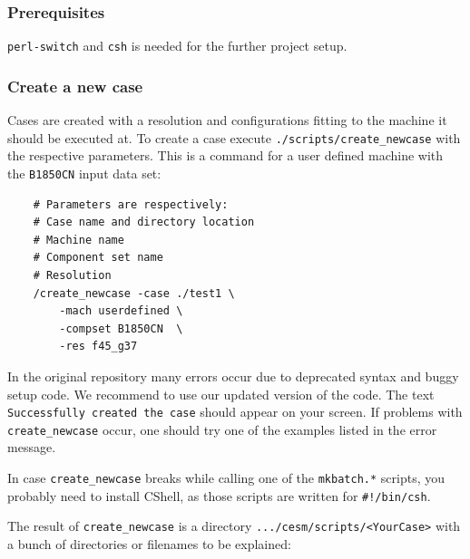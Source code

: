 \documentclass[]{article}
\begin{document}
\subsubsection{Prerequisites}\label{prerequisites}

\texttt{perl-switch} and \texttt{csh} is needed for the further project
setup.

\subsubsection{Create a new case}\label{create-a-new-case}

Cases are created with a resolution and configurations fitting to the
machine it should be executed at. To create a case execute
\texttt{./scripts/create\_newcase} with the respective parameters. This
is a command for a user defined machine with the \texttt{B1850CN} input
data set:

\begin{verbatim}
    # Parameters are respectively:
    # Case name and directory location
    # Machine name
    # Component set name
    # Resolution
    /create_newcase -case ./test1 \
        -mach userdefined \
        -compset B1850CN  \
        -res f45_g37
\end{verbatim}

In the original repository many errors occur due to deprecated syntax
and buggy setup code. We recommend to use our updated version of the
code. The text \texttt{Successfully\ created\ the\ case} should appear
on your screen. If problems with \texttt{create\_newcase} occur, one
should try one of the examples listed in the error message.

In case \texttt{create\_newcase} breaks while calling one of the
\texttt{mkbatch.*} scripts, you probably need to install CShell, as
those scripts are written for \texttt{\#!/bin/csh}.

The result of \texttt{create\_newcase} is a directory
\texttt{.../cesm/scripts/\textless{}YourCase\textgreater{}} with a bunch
of directories or filenames to be explained:
\end{document}
